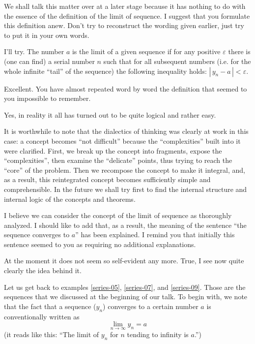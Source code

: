 {\athr We shall talk this matter over at a later stage because it has nothing to do with the essence of the definition of the limit of sequence.
I suggest that you formulate this definition anew. Don't try to reconstruct the wording given earlier, just try to put it in your own words.

\rdr I'll try. The number $a$ is the limit of a given sequence if for any positive $\varepsilon$ there is (one can find) a serial number $n$ such that for all subsequent numbers (i.e. for the whole infinite ``tail'' of the sequence) the following inequality holds: $| \, y_{n} - a \, | < \varepsilon$.

\athr Excellent. You have almost repeated word by word the definition that seemed to you impossible to remember.

\rdr Yes, in reality it all has turned out to be quite logical and rather easy.

\athr It is worthwhile to note that the dialectics of thinking was clearly at work in this case: a concept becomes ``not difficult'' because the ``complexities'' built into it were clarified. First, we break up the concept into fragments, expose the ``complexities'', then examine the ``delicate'' points, thus trying to reach the ``core'' of the problem. Then we recompose the concept to make it integral, and, as a result, this reintegrated concept becomes sufficiently simple and comprehensible. In the future we shall try first to find the internal structure and internal logic of the concepts and theorems.

I believe we can consider the concept of the limit of sequence as thoroughly analyzed. I should like to add that, as a result, the meaning of the sentence ``the sequence converges to $a$'' has been explained. I remind you that initially
this sentence seemed to you as requiring no additional explanations.

\rdr At the moment it does not seem so self-evident any more. True, I see 
now quite clearly the idea behind it.

\athr Let us get back to examples  \eqref{series-05}, \eqref{series-07}, and  \eqref{series-09}. Those are the sequences that we discussed at the beginning of our talk. To begin with, we note that the fact that a sequence ($y_{n}$) converges to a certain number $a$ is conventionally written as
\begin{equation*}%
\lim\limits_{n \to \infty} y_{n}= a	
\end{equation*}
(it reads like this: ``The limit of $y_{n}$ for $n$ tending to infinity is $a$.'')

}

